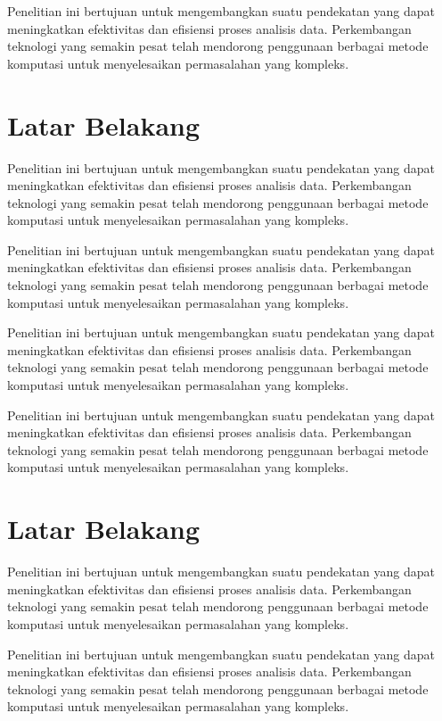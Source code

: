 Penelitian ini bertujuan untuk mengembangkan suatu pendekatan yang dapat meningkatkan efektivitas dan efisiensi proses analisis data. Perkembangan teknologi yang semakin pesat telah mendorong penggunaan berbagai metode komputasi untuk menyelesaikan permasalahan yang kompleks.

\section{Latar Belakang}

Penelitian ini bertujuan untuk mengembangkan suatu pendekatan yang dapat meningkatkan efektivitas dan efisiensi proses analisis data. Perkembangan teknologi yang semakin pesat telah mendorong penggunaan berbagai metode komputasi untuk menyelesaikan permasalahan yang kompleks.

Penelitian ini bertujuan untuk mengembangkan suatu pendekatan yang dapat meningkatkan efektivitas dan efisiensi proses analisis data. Perkembangan teknologi yang semakin pesat telah mendorong penggunaan berbagai metode komputasi untuk menyelesaikan permasalahan yang kompleks.

Penelitian ini bertujuan untuk mengembangkan suatu pendekatan yang dapat meningkatkan efektivitas dan efisiensi proses analisis data. Perkembangan teknologi yang semakin pesat telah mendorong penggunaan berbagai metode komputasi untuk menyelesaikan permasalahan yang kompleks.

Penelitian ini bertujuan untuk mengembangkan suatu pendekatan yang dapat meningkatkan efektivitas dan efisiensi proses analisis data. Perkembangan teknologi yang semakin pesat telah mendorong penggunaan berbagai metode komputasi untuk menyelesaikan permasalahan yang kompleks.

\section{Latar Belakang}

Penelitian ini bertujuan untuk mengembangkan suatu pendekatan yang dapat meningkatkan efektivitas dan efisiensi proses analisis data. Perkembangan teknologi yang semakin pesat telah mendorong penggunaan berbagai metode komputasi untuk menyelesaikan permasalahan yang kompleks.

Penelitian ini bertujuan untuk mengembangkan suatu pendekatan yang dapat meningkatkan efektivitas dan efisiensi proses analisis data. Perkembangan teknologi yang semakin pesat telah mendorong penggunaan berbagai metode komputasi untuk menyelesaikan permasalahan yang kompleks.

